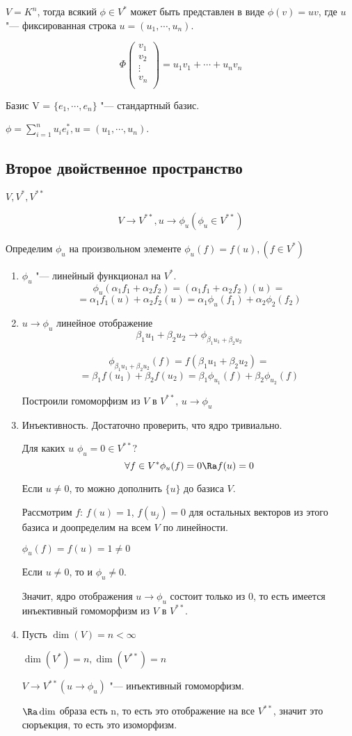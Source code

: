\begin{Rem}
$V = K^n$, тогда всякий $\phi \in V^{*}$ 
может быть представлен в виде $\phi(v) = uv$, где 
$u$ "--- фиксированная строка $u = (u_1, \cdots, u_n)$.

$$
\Phi\begin{pmatrix}
v_1\\
v_2\\
\vdots\\
v_n\\
\end{pmatrix} = u_1v_1 + \cdots + u_nv_n
$$

Базис V = $\{e_1, \cdots, e_n\}$ "--- стандартный базис.

$\phi = \sum_{i = 1}^{n}u_ie_i^{*}, u = (u_1, \cdots, u_n)$.
\end{Rem}

\subsection{Второе двойственное пространство}
$V, V^*, V^{**}$

$$V \to V^{**}, u \to \phi_u (\phi_u \in V^{**})$$

Определим $\phi_u$ на произвольном элементе $\phi_u(f) = f(u), (f \in V^*)$

\begin{enumerate}
\item $\phi_u$ "--- линейный функционал на $V^*$.
$$\phi_u(\alpha_1f_1 + \alpha_2f_2) = (\alpha_1f_1 + \alpha_2f_2)(u) = $$
$$= \alpha_1f_1(u) + \alpha_2f_2(u) = \alpha_1\phi_u(f_1) + \alpha_2\phi_2(f_2)$$
\item $u \to \phi_u$ линейное отображение
$$\beta_1u_1 + \beta_2u_2 \to \phi_{\beta_1u_1 + \beta_2u_2}$$

$$\phi_{\beta_1u_1 + \beta_2u_2}(f) = f(\beta_1u_1 + \beta_2u_2) = $$
$$= \beta_1f(u_1) + \beta_2f(u_2) = \beta_1 \phi_{u_1}(f) + \beta_2\phi_{u_2}(f)$$

Построили гомоморфизм из $V$  в $V^{**}$, $u \to \phi_u$
\item Инъективность. Достаточно проверить, что ядро тривиально. 

Для каких $u$ $\phi_u = 0 \in V^{**}$?
$$\forall f \in V^* \phi_u(f) = 0 \Ra f(u) = 0 $$

Если $u \ne 0$, то можно дополнить $\{u\}$ до базиса $V$.

Рассмотрим $f$: $f(u) = 1$, $f(u_j) = 0$ для остальных
векторов из этого базиса и доопределим на всем $V$ по линейности.

$\phi_u(f) = f(u) = 1 \ne 0$

Если $u \ne 0$, то и $\phi_u \ne 0$.

Значит, ядро отображения $u \to \phi_u$ состоит только из 0, 
то есть имеется инъективный гомоморфизм из $V$ в $V^{**}$.
\item Пусть $\dim(V) = n < \infty$

$\dim(V^{*}) = n, \dim(V^{**}) = n$

$V \to V^{**}(u \to \phi_u)$ "--- инъективный гомоморфизм.

$\Ra \dim$ образа есть n,  то есть это отображение на все $V^{**}$,
значит это сюръекция, то есть это изоморфизм.  
\end{enumerate}

